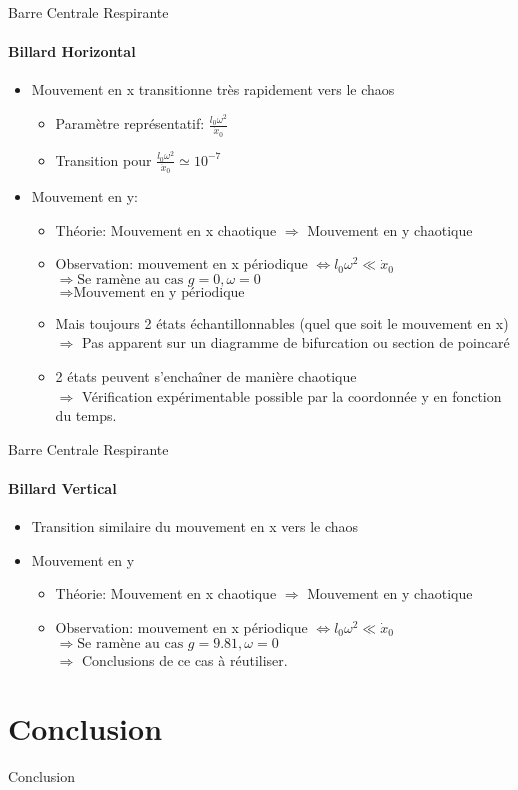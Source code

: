 \documentclass{beamer}
\begin{document}
  \begin{frame}{Barre Centrale Respirante}
  \framesubtitle{Billard Horizontal}
  \begin{itemize}
    \item Mouvement en x transitionne très rapidement vers le chaos
    \begin{itemize}
      \item Paramètre représentatif: \(\frac{l_0 \omega ^ 2}{\dot{x}_0}\)
      \item Transition pour \(\frac{l_0 \omega ^ 2}{\dot{x}_0} \simeq 10^{-7} \)
    \end{itemize}
    \item Mouvement en y:
    \begin{itemize}
      \item Théorie: Mouvement en x chaotique \( \Rightarrow \) Mouvement en y chaotique
      \item Observation: mouvement en x périodique \( \Leftrightarrow l_0 \omega ^ 2 \ll \dot{x}_0 \)\\ \( \Rightarrow \text{Se ramène au cas } g=0, \omega =0\) \\ \( \Rightarrow \text{Mouvement en y périodique} \)
      \item Mais toujours 2 états échantillonnables (quel que soit le mouvement en x)\\\(\Rightarrow\) Pas apparent sur un diagramme de bifurcation ou section de poincaré
      \item 2 états peuvent s'enchaîner de manière chaotique\\\(\Rightarrow\) Vérification expérimentable possible par la coordonnée y en fonction du temps.
    \end{itemize}
  \end{itemize}
  \end{frame}
  
    \begin{frame}{Barre Centrale Respirante}
  \framesubtitle{Billard Vertical}
  \begin{itemize}
    \item Transition similaire du mouvement en x vers le chaos
    \item Mouvement en y
    \begin{itemize}
      \item Théorie: Mouvement en x chaotique \( \Rightarrow \) Mouvement en y chaotique
      \item Observation: mouvement en x périodique \( \Leftrightarrow l_0 \omega ^ 2 \ll \dot{x}_0 \)\\ \( \Rightarrow \text{Se ramène au cas } g=9.81, \omega =0\)\\
      \( \Rightarrow\) Conclusions de ce cas à réutiliser.
    \end{itemize}
  \end{itemize}
  \end{frame}
  
  \section{Conclusion}
  
  \begin{frame}{Conclusion}
  
  \end{frame}
  
\end{document}
